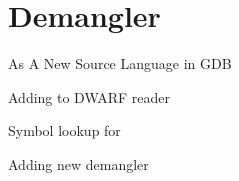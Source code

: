 \chapter{\CFAS Demangler} \label{demangler}

\CFAS As A New Source Language in GDB

Adding \CFAS to DWARF reader

Symbol lookup for \CFAS

Adding new demangler
